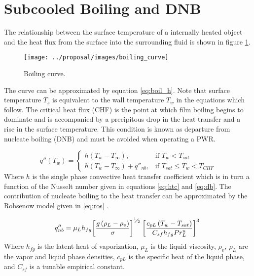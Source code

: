 \section{Subcooled Boiling and DNB}

The relationship between the surface temperature of a internally heated object and the heat flux from the surface into the surrounding fluid is shown in figure \ref{fig:boiling_curve}.

\begin{figure}[H]
    \centering
    \texttt{[image: ../proposal/images/boiling\_curve]}
    \caption{Boiling curve.}
    \label{fig:boiling_curve}
\end{figure}


The curve can be approximated by equation \ref{eq:boil_h}.  Note that surface temperature $T_s$ is equivalent to the wall temperature $T_w$ in the equations which follow.
The critical heat flux (CHF) is the point at which film boiling begins to dominate and is accompanied by a precipitous drop in the heat transfer and a rise in the surface temperature.  This condition is known as departure from nucleate boiling (DNB) and must be avoided when operating a PWR.

\begin{equation}
q''(T_w) = 
\begin{cases}
      h(T_w-T_{\infty}), & \mbox{if } T_w < T_{sat} \\
      h(T_w-T_{\infty}) + q''_{nb} ,  & \mbox{if } T_{sat} \leq T_w < T_{CHF} 
\end{cases}
\label{eq:boil_h}
\end{equation}
Where $h$ is the single phase convective heat transfer coefficient which is in turn a function of the Nusselt number given in equations \ref{eq:htc} and \ref{eq:db}.  The contribution of nucleate boiling to the heat transfer can be approximated by the Rohsenow model given in \ref{eq:ros} \cite{rohsenow51}.

\begin{equation}
q''_{nb} = {{\mu }_{L}}{{h}_{fg}}{{\left[ \frac{g\left( {{\rho }_{L}}-{{\rho }_{v}} \right)}{\sigma } \right]}^{{}^{1}\!\!\diagup\!\!{}_{2}\;}}{{\left[ \frac{{{c}_{pL}}\left( {{T}_{w}}-{{T}_{sat}} \right)}{{{C}_{sf}}{{h}_{fg}}Pr_{L}^{n}} \right]}^{3}\;}
\label{eq:ros}
\end{equation}
Where $h_{fg}$ is the latent heat of vaporization, $\mu_L$ is the liquid viscosity, $\rho_v,\ \rho_L$ are the vapor and liquid phase densities, ${c}_{pL}$ is the specific heat of the liquid phase, and ${C}_{sf}$ is a tunable empirical constant.


